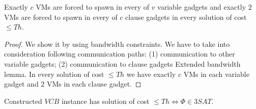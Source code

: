 \begin{lemma}
Exactly $c$ VMs are forced to spawn in every of $v$ variable gadgets
and exactly $2$ VMs are forced to spawn in every of $c$ clause gadgets
in every solution of cost $\leq Th$.
\end{lemma}

\begin{proof}
We show it by using bandwidth constraints. We have to take into
consideration following communication paths: (1) communication to
other variable gadgets; (2) communication to clause gadgets Extended
bandwidth lemma. In every solution of cost $\leq Th$ we have exactly
$c$ VMs in each variable gadget and $2$ VMs in each clause gadget.

\end{proof}

\begin{theorem}Constructed $VCB$ instance has solution of cost $\leq
  Th \iff \Phi \in 3SAT$.
\end{theorem}

